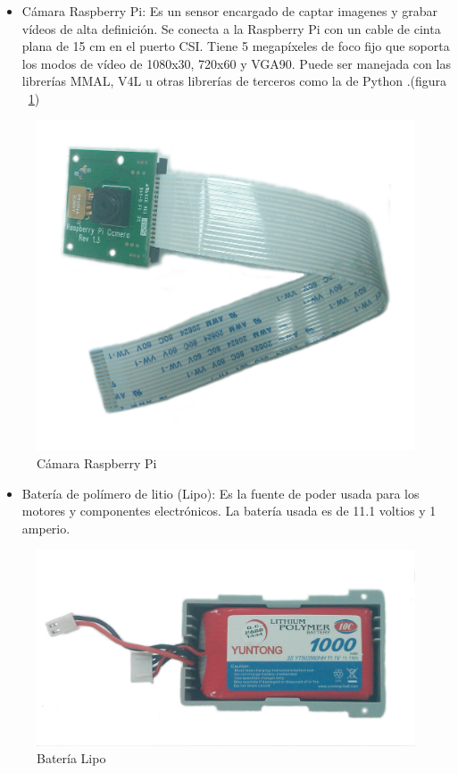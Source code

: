 \begin{itemize}
\item C\'amara Raspberry Pi: Es un sensor encargado de captar imagenes y grabar vídeos de alta definición. Se conecta a la Raspberry Pi con un cable de cinta plana de 15 cm en el puerto CSI. Tiene 5 megapíxeles de foco fijo que soporta los modos de vídeo de 1080x30, 720x60 y VGA90. Puede ser manejada con las librerías MMAL, V4L u otras librerías de terceros como la de Python \cite{raspberrycam}.(figura ~\ref{fig:came})  %

\end{itemize}

\begin{figure}[hbtp]
\centering
\includegraphics[scale=0.06]{imagenes/CamRasp.jpg}
\caption{C\'amara Raspberry Pi}
\label{fig:came}
\end{figure}


\begin{itemize}
\item Batería de polímero de litio (Lipo): Es la fuente de poder usada para los motores y componentes electr\'onicos. La batería usada es de 11.1 voltios y 1 amperio. \cite{bateria}
\end{itemize}


\begin{figure}[hbtp]
\centering
\includegraphics[scale=0.1]{imagenes/bateriaLipo.jpg}
\caption{Batería Lipo}
\label{bateria}
\end{figure}


